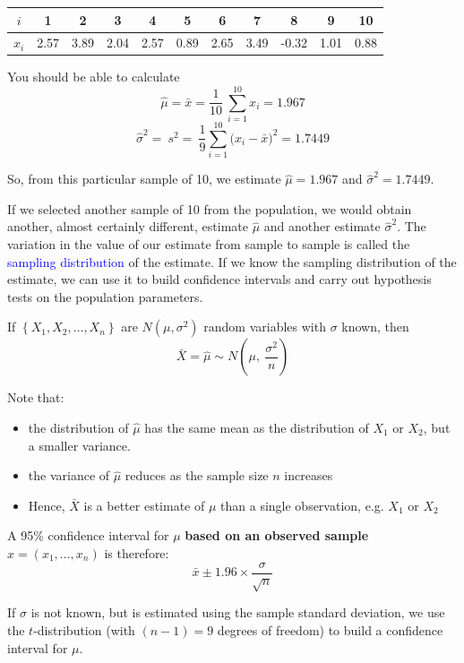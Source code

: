 \documentclass[12pt,a4paper,openany,twoside]{report}
\newcommand{\blue}{\textcolor{blue}}
\newcommand{\emphx}[1]{\blue{#1}}
\theoremstyle{definition}
\theoremstyle{remark}
\theoremstyle{plain}
\newcommand{\vsps}{\vspace{.5cm}}
\newcommand{\myd}[1]{\emphx{#1}}
\theoremstyle{definition}
\theoremstyle{definition}
\theoremstyle{definition}
\theoremstyle{remark}
\begin{document}
\begin{center}
\begin{tabular}{c|cccccccccc}
$i$ & 1 & 2 & 3 & 4 & 5 & 6 & 7 & 8 & 9 & 10\\ 
\hline
$x_i$ & 2.57 & 3.89 & 2.04 & 2.57 & 0.89 & 2.65 & 3.49 & -0.32 & 1.01 & 0.88
\end{tabular}
\end{center}
\vsps

You should be able to calculate
\[\hat{\mu} = \bar{x}= \frac{1}{10}\ \sum_{i = 1}^{10}x_{i} = 1.967\]
\[{\hat{\sigma}}^{2} = \ s^{2} = \ \frac{1}{9}\sum_{i = 1}^{10}{(x_{i} -\bar{x}})^{2} = 1.7449\]

So, from this particular sample of 10, we estimate \(\hat{\mu} = 1.967\)
and \(\hat{\sigma}^{2} = 1.7449\).
\vsps

If we selected another sample of 10 from the population, we would obtain
another, almost certainly different, estimate \(\hat{\mu}\) and another
estimate \({\hat{\sigma}}^{2}\). The variation in the value of our
estimate from sample to sample is called the \myd{sampling
distribution} of the estimate. If we know the sampling distribution of
the estimate, we can use it to build confidence intervals and carry out
hypothesis tests on the population parameters.

If \(\left\{ X_{1},X_{2},\ldots,X_{n} \right\}\) are
\(N(\mu,\sigma^{2})\) random variables with \(\sigma\) known, then
\[\bar{X}= \hat{\mu}\sim N\left(\mu,\ \frac{\sigma^{2}}{n}\right)\]

Note that:

\begin{itemize}
\item
  the distribution of \(\hat{\mu}\) has the same mean as the
  distribution of \(X_{1}\) or \(X_{2}\), but a smaller variance.
\item
  the variance of \(\hat{\mu}\) reduces as the sample size \(n\) increases
\item
  Hence, \(\bar{X}\) is a better estimate of \(\mu\)
  than a single observation, e.g. \(X_{1}\) or \(X_{2}\)
\end{itemize}

A 95\% confidence interval for \(\mu\) \textbf{based on an observed sample} \(x=(x_1,\dots,x_n)\) is therefore:
\[\bar{x} \pm 1.96\times\frac{\sigma}{\sqrt{n}}\]

If \(\sigma\) is not known, but is estimated using the sample standard
deviation, we use the \(t\)-distribution (with \((n - 1) = 9\) degrees
of freedom) to build a confidence interval for \(\mu\).
\vsps
\end{document}
